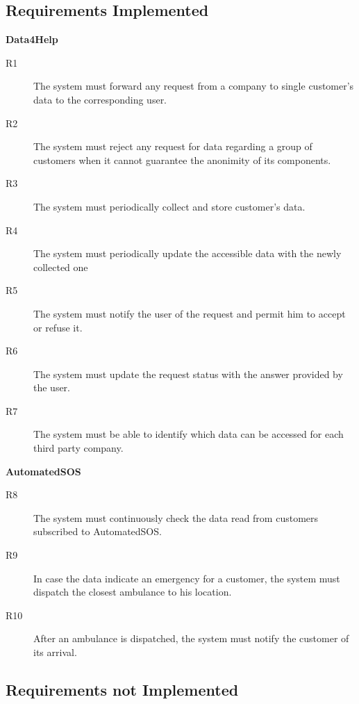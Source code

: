 \documentclass[../main.tex]{subfiles}
\begin{document}
\subsection{Requirements Implemented}	

	\vspace{1cm}

	{\bf Data4Help}
	
	\vspace{0.5cm}
	
	\begin{description}
		\item [R1] The system must forward any request from a company to single customer's data to the corresponding user.
	
		\item [R2] The system must reject any request for data regarding a group of customers when it cannot guarantee the anonimity of its components.
	
		\item [R3] The system must periodically collect and store customer's data.
		
		\item [R4] The system must periodically update the accessible data with the newly collected one
	
		\item [R5] The system must notify the user of the request and permit him to accept or refuse it.
	
		\item [R6] The system must update the request status with the answer provided by the user.
	
		\item [R7] The system must be able to identify which data can be accessed for each third party company.
	
	\end{description}

\vspace{8mm}
	

	{\bf AutomatedSOS}

	\vspace{0.5cm}

	\begin{description}
		\item [R8] The system must continuously check the data read from customers subscribed to AutomatedSOS.

		\item [R9] In case the data indicate an emergency for a customer, the system must dispatch the closest ambulance to his location.
	
		\item [R10] After an ambulance is dispatched, the system must notify the customer of its arrival.
	
	\end{description}

\subsection{Requirements not Implemented}	
\end{document}
